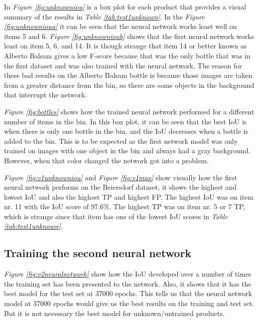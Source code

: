 In \textit{Figure \ref{fig:unknowniou}} is a box plot for each product that provides a visual summary of the results in \textit{Table \ref{tab:test1unknown}}. In the \textit{Figure \ref{fig:unknownioua}} it can be seen that the neural network works least well on items 5 and 6. \textit{Figure \ref{fig:unknownioub}} shows that the first neural network works least on item 5, 6, and 14. It is though strange that item 14 or better known as Alberto Balsam gives a low F-score because that was the only bottle that was in the first dataset and was also trained with the neural network. The reason for these bad results on the Alberto Balsam bottle is because those images are taken from a greater distance from the bin, so there are some objects in the background that interrupt the network. 

\textit{Figure \ref{fig:bottles}} shows how the trained neural network performed for a different number of items in the bin. In this box plot, it can be seen that the best IoU is when there is only one bottle in the bin, and the IoU decreases when a bottle is added to the bin. This is to be expected as the first network model was only trained on images with one object in the bin and always had a gray background. However, when that color changed the network got into a problem.

\textit{Figure \ref{fig:v1unknowniou}} and \textit{Figure \ref{fig:v1max}} show visually how the first neural network performs on the Beiersdorf dataset, it shows the highest and lowest IoU and also the highest TP and highest FP. The highest IoU was on item nr. 11 with the IoU score of 97.6\%. The highest TP was on item nr. 5 or 7 TP, which is strange since that item has one of the lowest IoU scores in \textit{Table \ref{tab:test1unknown}}.

\subsection{Training the second neural network}
\textit{Figure \ref{fig:v2neuralnetwork}} show how the IoU developed over a number of times the training set has been presented to the network. Also, it shows that it has the best model for the test set at 37000 epochs. This tells us that the neural network model at 37000 epochs would give us the best results on the training and test set. But it is not necessary the best model for unknown/untrained products.

